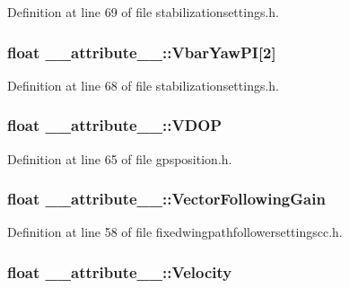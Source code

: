 \-Definition at line 69 of file stabilizationsettings.\-h.

\hypertarget{struct____attribute_____a6710592142d94562731332386434de96}{
\subsubsection[{\-Vbar\-Yaw\-P\-I}]{\setlength{\rightskip}{0pt plus 5cm}float {\bf \-\_\-\-\_\-attribute\-\_\-\-\_\-\-::\-Vbar\-Yaw\-P\-I}\mbox{[}2\mbox{]}}}\label{struct____attribute_____a6710592142d94562731332386434de96}


\-Definition at line 68 of file stabilizationsettings.\-h.

\hypertarget{struct____attribute_____af59be15fc3bec008a580afde48410a08}{
\subsubsection[{\-V\-D\-O\-P}]{\setlength{\rightskip}{0pt plus 5cm}float {\bf \-\_\-\-\_\-attribute\-\_\-\-\_\-\-::\-V\-D\-O\-P}}}\label{struct____attribute_____af59be15fc3bec008a580afde48410a08}


\-Definition at line 65 of file gpsposition.\-h.

\hypertarget{struct____attribute_____a01ed0c8efb8cf9a6e6783ca85a47f7b4}{
\subsubsection[{\-Vector\-Following\-Gain}]{\setlength{\rightskip}{0pt plus 5cm}float {\bf \-\_\-\-\_\-attribute\-\_\-\-\_\-\-::\-Vector\-Following\-Gain}}}\label{struct____attribute_____a01ed0c8efb8cf9a6e6783ca85a47f7b4}


\-Definition at line 58 of file fixedwingpathfollowersettingscc.\-h.

\hypertarget{struct____attribute_____a59fae582c2a213a1c04beaa1646c88ac}{
\subsubsection[{\-Velocity}]{\setlength{\rightskip}{0pt plus 5cm}float {\bf \-\_\-\-\_\-attribute\-\_\-\-\_\-\-::\-Velocity}}}\label{struct____attribute_____a59fae582c2a213a1c04beaa1646c88ac}


